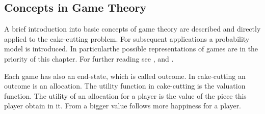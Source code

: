 \subsection{Concepts in Game Theory}
A brief introduction into basic concepts of game theory are described and directly applied to the cake-cutting problem. For subsequent applications a probability model is introduced.%
In particularthe possible representations of games are in the priority of this chapter. For further reading see \cite{gtt}, \cite{stl} and \cite{ba}. 
Each game has also an end-state, which is called outcome. In cake-cutting an outcome is an allocation.
The utility function in cake-cutting is the valuation function. The utility of an allocation for a player is the value of the piece this player obtain in it. From a bigger value follows more happiness for a player.
